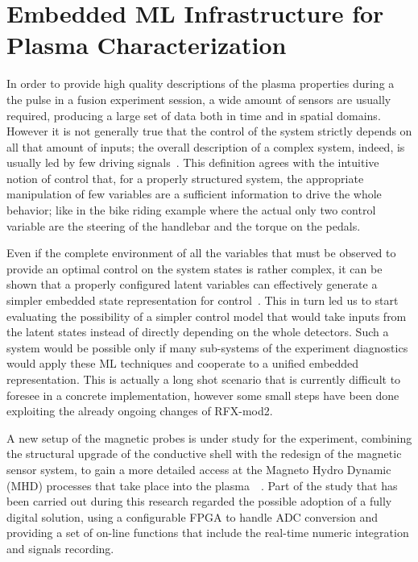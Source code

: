 
\chapter{Embedded ML Infrastructure for Plasma Characterization}
\label{section:4_embedded_ML}

In order to provide high quality descriptions of the plasma properties during a the pulse in a fusion experiment session, a wide amount of sensors are usually required, producing a large set of data both in time and in spatial domains.
However it is not generally true that the control of the system strictly depends on all that amount of inputs; the overall description of a complex system, indeed, is usually led by few driving signals~\cite{Liu2011}. 
This definition agrees with the intuitive notion of control that, for a properly structured system, the appropriate manipulation of few variables are a sufficient information to drive the whole behavior; like in the bike riding example where the actual only two control variable are the steering of the handlebar and the torque on the pedals. 

Even if the complete environment of all the variables that must be observed to provide an optimal control on the system states is rather complex, it can be shown that a properly configured latent variables can effectively generate a simpler embedded state representation for control~\cite{Lesort_2018, an2019unsupervised}. This in turn led us to start evaluating the possibility of a simpler control model that would take inputs from the latent states instead of directly depending on the whole detectors.
Such a system would be possible only if many sub-systems of the experiment diagnostics would apply these ML techniques and cooperate to a unified embedded representation. 
This is actually a long shot scenario that is currently difficult to foresee in a concrete implementation, however some small steps have been done exploiting the already ongoing changes of RFX-mod2.

A new setup of the magnetic probes is under study for the experiment, combining the structural upgrade of the conductive shell with the redesign of the magnetic sensor system, to gain a more detailed access at the Magneto Hydro Dynamic (MHD) processes that take place into the plasma~\cite{zuin2009current}~\cite{innocente2014tearing}.
Part of the study that has been carried out during this research regarded the possible adoption of a fully digital solution, using a configurable FPGA to handle ADC conversion and providing a set of on-line functions that include the real-time numeric integration and signals recording.

